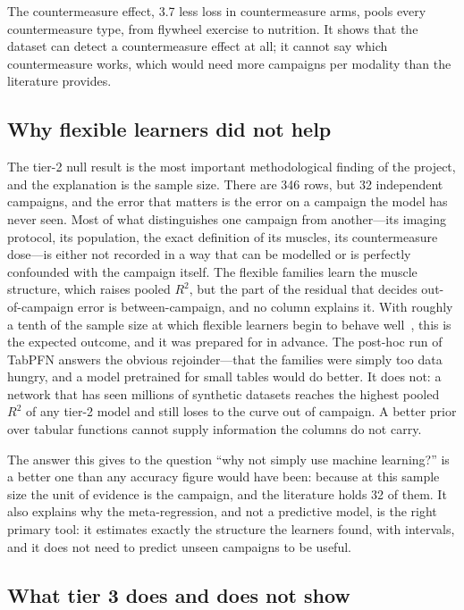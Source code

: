 The countermeasure effect, 3.7\pp{} less loss in countermeasure arms, pools every countermeasure type, from flywheel
exercise to nutrition. It shows that the dataset can detect a countermeasure effect at all; it cannot say which
countermeasure works, which would need more campaigns per modality than the literature provides.

\subsection{Why flexible learners did not help}

The tier-2 null result is the most important methodological finding of the project, and the explanation is the
sample size. There are 346 rows, but 32 independent campaigns, and the error that matters is the error on a campaign
the model has never seen. Most of what distinguishes one campaign from another---its imaging protocol, its
population, the exact definition of its muscles, its countermeasure dose---is either not recorded in a way that can be
modelled or is perfectly confounded with the campaign itself. The flexible families learn the muscle structure, which
raises pooled $R^2$, but the part of the residual that decides out-of-campaign error is between-campaign, and no
column explains it. With roughly a tenth of the sample size at which flexible learners begin to behave
well~\citep{vanderploeg2014}, this is the expected outcome, and it was prepared for in advance. The post-hoc run of
TabPFN answers the obvious rejoinder---that the families were simply too data hungry, and a model pretrained for
small tables would do better. It does not: a network that has seen millions of synthetic datasets reaches the highest
pooled $R^2$ of any tier-2 model and still loses to the curve out of campaign. A better prior over tabular functions
cannot supply information the columns do not carry.

The answer this gives to the question ``why not simply use machine learning?'' is a better one than any accuracy
figure would have been: because at this sample size the unit of evidence is the campaign, and the literature holds 32
of them. It also explains why the meta-regression, and not a predictive model, is the right primary tool: it
estimates exactly the structure the learners found, with intervals, and it does not need to predict unseen campaigns
to be useful.

\subsection{What tier 3 does and does not show}

